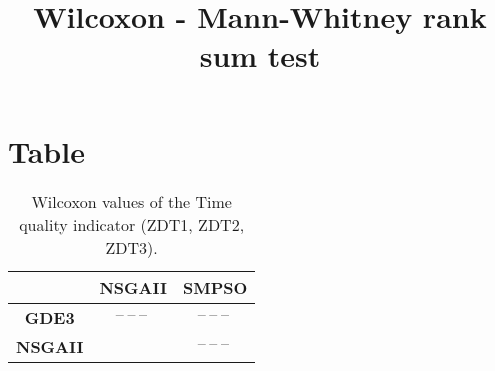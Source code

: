 \documentclass{article}
\title{Wilcoxon - Mann-Whitney rank sum test}
\author{}
\begin{document}
\maketitle
\section{Table}
\begin{table}[!htp]
  \caption{Wilcoxon values of the Time quality indicator (ZDT1, ZDT2, ZDT3).}
  \label{table:Time}
  \centering
  \begin{scriptsize}
  \begin{tabular}{c|cc}
      & \textbf{NSGAII} & \textbf{SMPSO} \\\hline
      \textbf{GDE3} & $\text{--}\ \text{--}\ \text{--}\  $ & $ \text{--}\ \text{--}\ \text{--}\ $ \\
      \textbf{NSGAII} & $ $ & $ \text{--}\ \text{--}\ \text{--}\ $ \\
  \end{tabular}
  \end{scriptsize}
\end{table}
\end{document}
